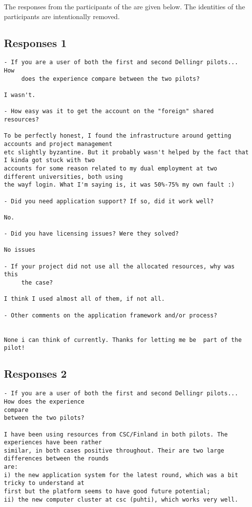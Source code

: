 {
The responses from the participants of the \pilot are given below.
The identities of the participants are intentionally removed.

\subsection*{Responses 1}
\begin{verbatim}
- If you are a user of both the first and second Dellingr pilots... How
     does the experience compare between the two pilots?

I wasn't. 

- How easy was it to get the account on the "foreign" shared resources?

To be perfectly honest, I found the infrastructure around getting accounts and project management 
etc slightly byzantine. But it probably wasn't helped by the fact that I kinda got stuck with two 
accounts for some reason related to my dual employment at two different universities, both using 
the wayf login. What I'm saying is, it was 50%-75% my own fault :) 

- Did you need application support? If so, did it work well?

No.

- Did you have licensing issues? Were they solved?

No issues

- If your project did not use all the allocated resources, why was this
     the case?

I think I used almost all of them, if not all. 

- Other comments on the application framework and/or process?


None i can think of currently. Thanks for letting me be  part of the pilot!
\end{verbatim}
\subsection*{Responses 2}
\begin{verbatim}
- If you are a user of both the first and second Dellingr pilots... How does the experience
compare 
between the two pilots?

I have been using resources from CSC/Finland in both pilots. The experiences have been rather
similar, in both cases positive throughout. Their are two large differences between the rounds 
are: 
i) the new application system for the latest round, which was a bit tricky to understand at
first but the platform seems to have good future potential; 
ii) the new computer cluster at csc (puhti), which works very well.


\end{verbatim}}
